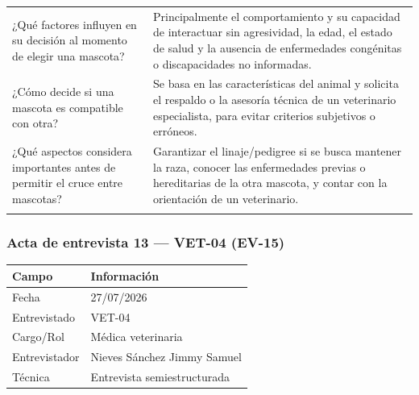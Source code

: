 \documentclass[journal,onecolumn]{IEEEtran}
\begin{document}
{\begin{longtable}{@{}p{5.6cm} p{9.4cm}@{}}
			¿Qué factores influyen en su decisión al momento de elegir una mascota? & Principalmente el comportamiento y su capacidad de interactuar sin agresividad, la edad, el estado de salud y la ausencia de enfermedades congénitas o discapacidades no informadas. \\ \addlinespace
			
			¿Cómo decide si una mascota es compatible con otra? & Se basa en las características del animal y solicita el respaldo o la asesoría técnica de un veterinario especialista, para evitar criterios subjetivos o erróneos. \\ \addlinespace
			
			¿Qué aspectos considera importantes antes de permitir el cruce entre mascotas? & Garantizar el linaje/pedigree si se busca mantener la raza, conocer las enfermedades previas o hereditarias de la otra mascota, y contar con la orientación de un veterinario. \\ \addlinespace
			
		\end{longtable}
	}
	
	
	\subsubsection*{Acta de entrevista 13 --- VET-04 (EV-15)}
	
	\begin{table}[H]
		\centering\small
		\begin{tabularx}{\textwidth}{@{}l X@{}}
			\toprule
			\textbf{Campo} & \textbf{Información} \\
			\midrule
			
			Fecha & 27/07/2026 \\
			
			Entrevistado & VET-04 \\
			
			Cargo/Rol & Médica veterinaria \\
			
			Entrevistador & Nieves Sánchez Jimmy Samuel \\
			
			Técnica & Entrevista semiestructurada \\
			
			\bottomrule
		\end{tabularx}
	\end{table}
	
\end{document}
